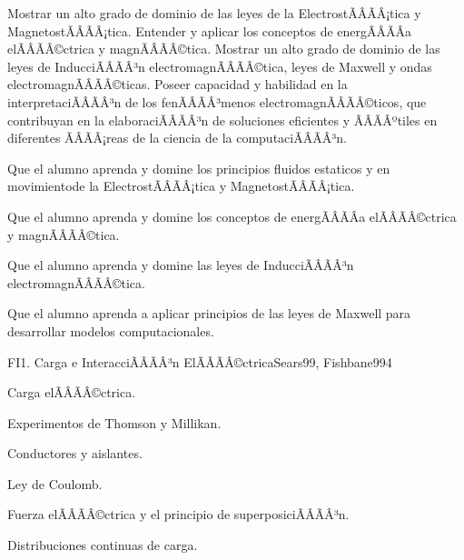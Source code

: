 \begin{sumilla}


\begin{fundamentacion}
Mostrar un alto grado de dominio de las leyes de la ElectrostÃÂÃÂ¡tica y MagnetostÃÂÃÂ¡tica. Entender y aplicar los conceptos de energÃÂÃÂ­a elÃÂÃÂ©ctrica y magnÃÂÃÂ©tica. Mostrar un alto grado de dominio de las leyes de InducciÃÂÃÂ³n electromagnÃÂÃÂ©tica, leyes de Maxwell y ondas electromagnÃÂÃÂ©ticas. Poseer capacidad y habilidad en la interpretaciÃÂÃÂ³n de los fenÃÂÃÂ³menos electromagnÃÂÃÂ©ticos, que contribuyan en la elaboraciÃÂÃÂ³n de soluciones eficientes y ÃÂÃÂºtiles en diferentes ÃÂÃÂ¡reas de la ciencia de la computaciÃÂÃÂ³n. 
\end{fundamentacion}

\begin{objetivosdelcurso}
\item  Que el alumno aprenda y domine los principios fluidos estaticos y en movimientode la ElectrostÃÂÃÂ¡tica y MagnetostÃÂÃÂ¡tica.
\item  Que el alumno aprenda y domine los conceptos de energÃÂÃÂ­a elÃÂÃÂ©ctrica y magnÃÂÃÂ©tica.
\item  Que el alumno aprenda y domine las leyes de InducciÃÂÃÂ³n electromagnÃÂÃÂ©tica.
\item  Que el alumno aprenda a aplicar principios de las leyes de Maxwell para desarrollar modelos computacionales.
\end{objetivosdelcurso}

\begin{outcomes}
\end{outcomes}

\begin{unit}{FI1. Carga e InteracciÃÂÃÂ³n ElÃÂÃÂ©ctrica}{Sears99, Fishbane99}{4}
   \begin{topicos}
         \item  Carga elÃÂÃÂ©ctrica.
	 \item  Experimentos de Thomson y Millikan.
         \item  Conductores y aislantes.
	 \item  Ley de Coulomb.
         \item  Fuerza elÃÂÃÂ©ctrica y el principio de superposiciÃÂÃÂ³n.
         \item  Distribuciones continuas de carga.
   \end{topicos}


\end{unit}
\end{sumilla}
